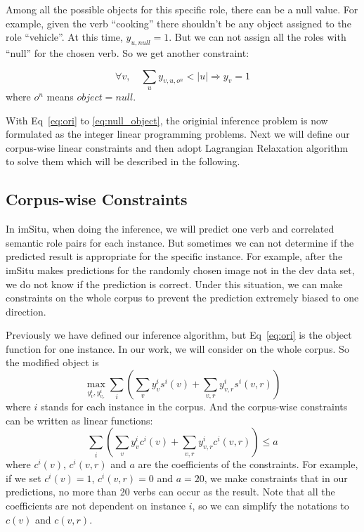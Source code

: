 Among all the possible objects for this specific role, there can be a null value. For example, given the verb ``cooking'' there shouldn't be any object  assigned to the role ``vehicle''. At this time, $y_{u,null} = 1$. But we can not assign all the roles with ``null'' for the chosen verb. So we get another constraint:

\begin{equation}
\forall v, \quad \sum_u y_{v,u,o^n} < |u| \Longrightarrow y_v =1
\label{eq:null_object}
\end{equation}
where $o^n$ means $object = null$.

With Eq~\eqref{eq:ori} to \eqref{eq:null_object}, the originial inference problem is now formulated as the integer linear programming problems. Next we will define our corpus-wise linear constraints and then adopt Lagrangian Relaxation algorithm to solve them which will be described in the following.


\subsection{Corpus-wise Constraints}

In imSitu, when doing the inference, we will predict one verb and correlated semantic role pairs for each instance. But sometimes we can not determine if  the predicted result is appropriate  for the specific instance. 
 For example, after the imSitu makes predictions for the randomly chosen image not in the dev data set, we do not know if the prediction is correct. Under this situation, we can make constraints on the whole corpus to prevent the prediction extremely biased to one direction. 

Previously we have defined our inference algorithm, but
Eq~\eqref{eq:ori} is the object function for one instance. In our work, we will consider on the whole corpus. So the modified object is 
\begin{equation}
 \max_{y^i_v, y^i_{v_r}}{\sum_i(\sum_v y^i_v s^i(v) + \sum_{v,r}y^i_{v,r}s^i(v,r))}
 \label{eq:con_obj}
\end{equation}
where $i$ stands for each instance in the corpus.
And the corpus-wise constraints can be written as linear functions:
\begin{equation}\label{eq:cor_cons}
 \sum_i(\sum_v y^i_v c^i(v) + \sum_{v,r}y^i_{v,r}c^i(v,r)) \leq a
\end{equation}
where $c^i(v)$, $c^i(v,r)$ and $a$ are the coefficients of the constraints. For example, if we set $c^i(v) = 1$, $c^i(v,r) = 0$ and $a = 20$, we make constraints that in our predictions, no more than 20 verbs can occur as the result. Note that all the coefficients are not dependent on instance $i$, so we can simplify the notations to $c(v)$ and $c(v,r)$.

